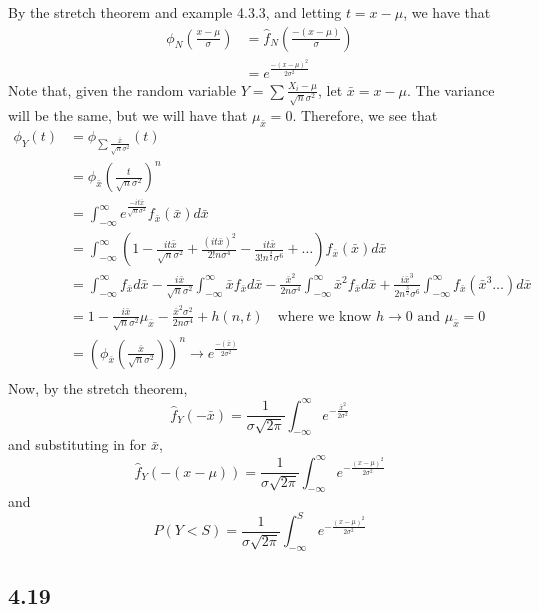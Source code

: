 \documentclass[letterpaper,12pt]{article}
\theoremstyle{definition}
\begin{document}
By the stretch theorem and example 4.3.3, and letting $t = x - \mu$, we have that
\begin{align*}
\phi_N(\frac{x-\mu}{\sigma}) & = \hat f_N(\frac{-(x-\mu)}{\sigma})\\
&= e^{\frac{-(x-\mu)^2}{2\sigma^2}}
\end{align*}
Note that, given the random variable $Y = \sum \frac{X_i - \mu}{\sqrt{n} \sigma^2}$, let $\bar x = x - \mu$. The variance will be the same, but we will have that $\mu_{\bar x} = 0$. Therefore, we see that
\begin{align*}
    \phi_Y(t) & = \phi_{\sum \frac{\bar x}{\sqrt{n} \sigma^2}}(t) \\
    & = \phi_{\bar x} (\frac{t}{\sqrt{n}\sigma^2})^n \\
    & = \int _{-\infty} ^\infty e ^{\frac{-it\bar x}{\sqrt{n} \sigma^2}} f_{\bar x}(\bar x)d\bar x \\
    & = \int _{-\infty} ^\infty (1 - \frac{it \bar x}{\sqrt{n} \sigma^2}
    + \frac{(it \bar x) ^2}{2!n\sigma^4}
    - \frac{i t \bar x}{3! n^{\frac{3}{2}} \sigma^6} 
    + \dots ) f_{\bar x} (\bar x) d \bar x  \\
    & =  \int _{-\infty} ^\infty f_{\bar x} d \bar x 
    - \frac{i \bar x}{\sqrt{n} \sigma^2}\int _{-\infty} ^\infty \bar x f_{\bar x} d \bar x
    - \frac{\bar x ^2}{2n \sigma^4}\int _{-\infty} ^\infty \bar x^2 f_{\bar x} d \bar x 
    + \frac{i \bar x ^3}{2n^{\frac{3}{2}} \sigma ^6}\int _{-\infty} ^\infty f_{\bar x}(\bar x^3 \dots )  d \bar x \\
    & = 1 - \frac{i \bar x}{\sqrt{n} \sigma^2} \mu_{\bar x} - \frac{\bar x ^2 \sigma^2}{2 n \sigma^4}+h(n,t) \quad \text{where we know $h \rightarrow 0$ and $\mu_{\bar x} = 0$}\\
    & = \left(\phi_{\bar x}\left(\frac{\bar x}{\sqrt{n}\sigma^2}\right)\right)^n
    \rightarrow e^{\frac{-(\bar x)}{2 \sigma^2}}\\
\end{align*}
Now, by the stretch theorem,
\[
\hat f_Y(-\bar x) = \frac{1}{\sigma \sqrt{2 \pi}} \int ^\infty _{-\infty} e ^{-\frac{\bar x^2}{2 \sigma ^2}}
    \]
and substituting in for $\bar x$, 
\[
\hat f_Y(-( x- \mu)) = \frac{1}{\sigma \sqrt{2 \pi}} \int ^\infty _{-\infty} e ^{-\frac{(x - \mu)^2}{2 \sigma ^2}}
\]
and
\[
P(Y<S) = \frac{1}{\sigma \sqrt{2 \pi}} \int ^S _{-\infty} e ^{-\frac{(x - \mu)^2}{2 \sigma ^2}}
\]


\subsection*{4.19}
\end{document}

